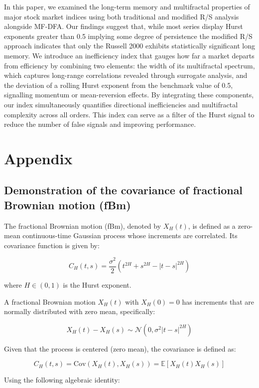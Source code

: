 \documentclass[11pt]{extarticle}
\begin{document}
In this paper, we examined the long-term memory and multifractal properties of major stock market indices using both
traditional and modified R/S analysis alongside MF-DFA. Our findings
suggest that, while most series display Hurst exponents greater than 0.5 implying some degree of persistence the
modified R/S approach indicates that only the Russell 2000 exhibits statistically significant long memory.
We introduce an inefficiency index that gauges how far a market departs from efficiency by combining two elements:
the width of its multifractal spectrum, which captures long-range correlations revealed through surrogate analysis, and
the deviation of a rolling Hurst exponent from the benchmark value of 0.5, signalling momentum or mean-reversion effects.
By integrating these components, our index simultaneously quantifies directional inefficiencies and multifractal complexity across
all orders. This index can serve as a filter of the Hurst signal to reduce the number of false signals and improving performance.


\newpage

\section{Appendix}

\subsection{Demonstration of the covariance of fractional Brownian motion (fBm)}
\label{sec:covariance_fbm}

The fractional Brownian motion (fBm), denoted by \( X_H(t) \), is defined as a zero-mean continuous-time Gaussian process whose increments are correlated. Its covariance function is given by:

\[
C_H(t,s) = \frac{\sigma^2}{2}\left(t^{2H}+s^{2H}-|t-s|^{2H}\right)
\]

where \( H \in (0,1) \) is the Hurst exponent.

A fractional Brownian motion \( X_H(t) \) with \( X_H(0)=0 \) has increments that are normally distributed with zero mean, specifically:

\[
X_H(t)-X_H(s) \sim \mathcal{N}(0,\sigma^2|t-s|^{2H})
\]

Given that the process is centered (zero mean), the covariance is defined as:

\[
C_H(t,s) = \text{Cov}(X_H(t), X_H(s)) = \mathbb{E}[X_H(t)X_H(s)]
\]

Using the following algebraic identity:
\end{document}
